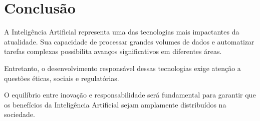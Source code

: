 \documentclass[11pt]{article}
\begin{document}
\section{Conclusão}

A Inteligência Artificial representa uma das tecnologias mais impactantes da atualidade. Sua
capacidade de processar grandes volumes de dados e automatizar tarefas complexas possibilita
avanços significativos em diferentes áreas.

Entretanto, o desenvolvimento responsável dessas tecnologias exige atenção a questões éticas,
sociais e regulatórias.

O equilíbrio entre inovação e responsabilidade será fundamental para garantir que os benefícios
da Inteligência Artificial sejam amplamente distribuídos na sociedade.  
\end{document}
